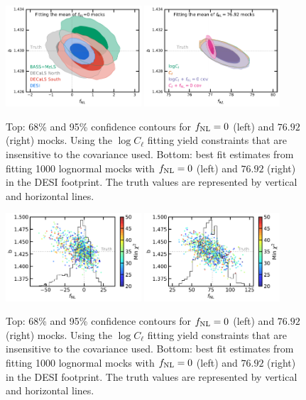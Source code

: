 \begin{figure}
    \centering
    \includegraphics[width=0.45\textwidth]{figures/mcmc_zero.pdf} 
    \includegraphics[width=0.45\textwidth]{figures/mcmc_po100.pdf} 
    \caption{Top: 68\% and 95\% confidence contours for $f_{\rm NL}=0$ (left) and $76.92$ (right) mocks. Using the $\log C_{\ell}$ fitting yield constraints that are insensitive to the covariance used. Bottom: best fit estimates from fitting 1000 lognormal mocks with $f_{\rm NL}=0$ (left) and $76.92$ (right) in the DESI footprint. The truth values are represented by vertical and horizontal lines.}\label{fig:mcmc_mocks}
\end{figure}

\begin{figure}
    \centering
    \includegraphics[width=0.45\textwidth]{figures/bestfit_zero.pdf} 
    \includegraphics[width=0.45\textwidth]{figures/bestfit_po100.pdf}         
    \caption{Top: 68\% and 95\% confidence contours for $f_{\rm NL}=0$ (left) and $76.92$ (right) mocks. Using the $\log C_{\ell}$ fitting yield constraints that are insensitive to the covariance used. Bottom: best fit estimates from fitting 1000 lognormal mocks with $f_{\rm NL}=0$ (left) and $76.92$ (right) in the DESI footprint. The truth values are represented by vertical and horizontal lines.}\label{fig:bestfit_mocks}
\end{figure}





